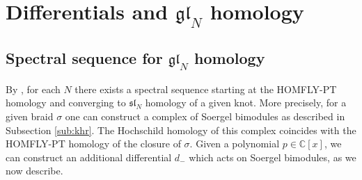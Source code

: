 \documentclass[12pt]{amsart}
\numberwithin{equation}{section}
\theoremstyle{definition}
\theoremstyle{remark}
\newtheorem{example}[theorem]{Example}
\newcommand{\CC}{\mathbb{C}}
\renewcommand{\1}{\mathbf{1}}
\newcommand{\fsl}{\mathfrak{sl}}
\newcommand{\fgl}{\mathfrak{gl}}
\begin{document}


\section{Differentials and $\fgl_N$ homology}
\label{sec:differentials}

\subsection{Spectral sequence for $\fgl_N$ homology}
\label{sub:spectral diff}

By \cite{RasDiff}, for each $N$ there exists a spectral sequence starting at the HOMFLY-PT homology and converging to $\fsl_N$ homology of a given knot.  More precisely, for a given braid $\sigma$ one can construct a complex of Soergel bimodules as described in Subsection \ref{sub:khr}. The Hochschild homology of this complex coincides with the HOMFLY-PT homology of the closure of $\sigma$. Given a polynomial \(p \in \CC[x]\),  we can construct an additional differential \(d_-\) which acts on Soergel bimodules, as we now describe. 
\end{document}
